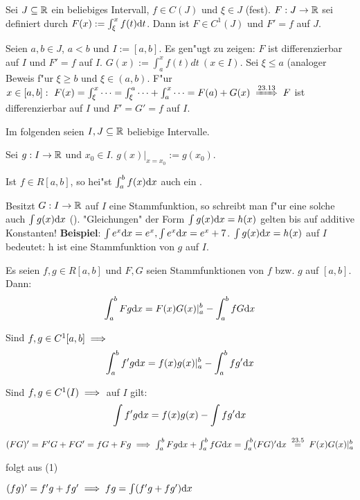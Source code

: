 \documentclass[a4paper,twoside,DIV15,BCOR12mm]{scrbook}
\begin{document}
\begin{satz}
Sei $J \subseteq \mathbb{R}$ ein beliebiges Intervall, $f \in C(J)$ und $\xi \in J$ (fest). $F:J\to\mathbb{R}$ sei definiert durch $F(x):=\int_{\xi}^xf(t)\text{d}t$. Dann ist $F\in C^1(J)$ und $F'=f$ auf $J$. 
\end{satz}


\begin{beweis}
Seien $a,b \in J$, $a<b$ und $I:=[a,b]$. Es gen"ugt zu zeigen: $F$ ist differenzierbar auf $I$ und $F'=f$ auf $I$. $G(x):=\int_a^xf(t)dt\ (x\in I)$. Sei $\xi\le a$ (analoger Beweis f"ur $\xi\ge b$ und $\xi \in (a,b)$. F"ur $x \in [a,b]:\ F(x)=\int_{\xi}^x\cdots = \int_{\xi}^a\cdots + \int_a^x\cdots=F(a)+G(x)\folgtnach{23.13} F$ ist differenzierbar auf $I$ und $F'=G'=f$ auf $I$.
\end{beweis}

\begin{definition}
Im folgenden seien $I,J\subseteq\mathbb{R}$ beliebige Intervalle.
\begin{liste}
\item Sei $g:I\to\mathbb{R}$ und $x_0\in I$. $g(x)|_{x=x_0}:=g(x_0).$
\item Ist $f \in R[a,b]$, so hei"st $\int_a^bf(x)\text{d}x$ auch ein .
\item Besitzt $G:I\to\mathbb{R}$ auf $I$ eine Stammfunktion, so schreibt man f"ur eine solche auch $\int g(x)\text{d}x$ (). "Gleichungen" der Form $\int g(x)\text{d}x=h(x)$ gelten bis auf additive Konstanten! \textbf{Beispiel}: $\int e^x\text{d}x=e^x, \int e^x\text{d}x=e^x + 7$. $\int g(x)\text{d}x=h(x)$ auf $I$ bedeutet: h ist eine Stammfunktion von $g$ auf $I$.
\end{liste}
\end{definition}

\begin{satz}
\begin{liste}
\item Es seien $f,g \in R[a,b]$ und $F,G$ seien Stammfunktionen von $f$ bzw. $g$ auf $[a,b]$. Dann: $$\int_a^bFg\text{d}x=F(x)G(x)|_a^b-\int_a^bfG\text{d}x$$
\item Sind $f,g \in C^1[a,b] \implies$ $$\int_a^b f'g\text{d}x=f(x)g(x)|_a^b-\int_a^bfg'\text{d}x$$
\item Sind $f,g \in C^1(I) \implies$ auf $I$ gilt: $$\int f'g\text{d}x=f(x)g(x)-\int fg'\text{d}x$$
\end{liste}
\end{satz}

\begin{beweise}
\item $(FG)'=F'G+FG'=fG+Fg\folgt \int_a^bFg\dx+\int_a^bfG\dx=\int_a^b(FG)'\dx\gleichnach{23.5}F(x)G(x)|_a^b$
\item folgt aus (1)
\item $(fg)'=f'g+fg'\implies fg=\int(f'g+fg')\text{d}x$
\end{beweise}
\end{document}
